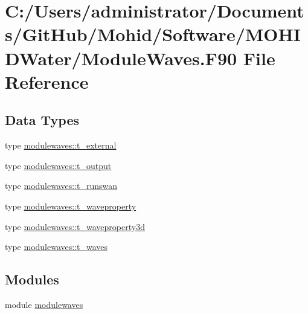 \hypertarget{_module_waves_8_f90}{}\section{C\+:/\+Users/administrator/\+Documents/\+Git\+Hub/\+Mohid/\+Software/\+M\+O\+H\+I\+D\+Water/\+Module\+Waves.F90 File Reference}
\label{_module_waves_8_f90}
\subsection*{Data Types}
\begin{DoxyCompactItemize}
\item 
type \mbox{\hyperlink{structmodulewaves_1_1t__external}{modulewaves\+::t\+\_\+external}}
\item 
type \mbox{\hyperlink{structmodulewaves_1_1t__output}{modulewaves\+::t\+\_\+output}}
\item 
type \mbox{\hyperlink{structmodulewaves_1_1t__runswan}{modulewaves\+::t\+\_\+runswan}}
\item 
type \mbox{\hyperlink{structmodulewaves_1_1t__waveproperty}{modulewaves\+::t\+\_\+waveproperty}}
\item 
type \mbox{\hyperlink{structmodulewaves_1_1t__waveproperty3d}{modulewaves\+::t\+\_\+waveproperty3d}}
\item 
type \mbox{\hyperlink{structmodulewaves_1_1t__waves}{modulewaves\+::t\+\_\+waves}}
\end{DoxyCompactItemize}
\subsection*{Modules}
\begin{DoxyCompactItemize}
\item 
module \mbox{\hyperlink{namespacemodulewaves}{modulewaves}}
\end{DoxyCompactItemize}
